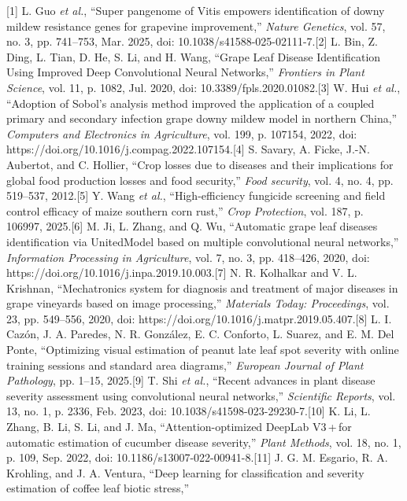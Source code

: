\documentclass[
]{article}
\begin{document}
{[}1{]} L. Guo \emph{et al.}, ``Super pangenome of Vitis empowers
identification of downy mildew resistance genes for grapevine
improvement,'' \emph{Nature Genetics}, vol. 57, no. 3, pp. 741--753,
Mar. 2025, doi: 10.1038/s41588-025-02111-7.{[}2{]} L. Bin, Z. Ding, L.
Tian, D. He, S. Li, and H. Wang, ``Grape Leaf Disease Identification
Using Improved Deep Convolutional Neural Networks,'' \emph{Frontiers in
Plant Science}, vol. 11, p. 1082, Jul. 2020, doi:
10.3389/fpls.2020.01082.{[}3{]} W. Hui \emph{et al.}, ``Adoption of
Sobol's analysis method improved the application of a coupled primary
and secondary infection grape downy mildew model in northern China,''
\emph{Computers and Electronics in Agriculture}, vol. 199, p. 107154,
2022, doi: https://doi.org/10.1016/j.compag.2022.107154.{[}4{]} S.
Savary, A. Ficke, J.-N. Aubertot, and C. Hollier, ``Crop losses due to
diseases and their implications for global food production losses and
food security,'' \emph{Food security}, vol. 4, no. 4, pp. 519--537,
2012.{[}5{]} Y. Wang \emph{et al.}, ``High-efficiency fungicide
screening and field control efficacy of maize southern corn rust,''
\emph{Crop Protection}, vol. 187, p. 106997, 2025.{[}6{]} M. Ji, L.
Zhang, and Q. Wu, ``Automatic grape leaf diseases identification via
UnitedModel based on multiple convolutional neural networks,''
\emph{Information Processing in Agriculture}, vol. 7, no. 3, pp.
418--426, 2020, doi: https://doi.org/10.1016/j.inpa.2019.10.003.{[}7{]}
N. R. Kolhalkar and V. L. Krishnan, ``Mechatronics system for diagnosis
and treatment of major diseases in grape vineyards based on image
processing,'' \emph{Materials Today: Proceedings}, vol. 23, pp.
549--556, 2020, doi: https://doi.org/10.1016/j.matpr.2019.05.407.{[}8{]}
L. I. Cazón, J. A. Paredes, N. R. González, E. C. Conforto, L. Suarez,
and E. M. Del Ponte, ``Optimizing visual estimation of peanut late leaf
spot severity with online training sessions and standard area
diagrams,'' \emph{European Journal of Plant Pathology}, pp. 1--15,
2025.{[}9{]} T. Shi \emph{et al.}, ``Recent advances in plant disease
severity assessment using convolutional neural networks,''
\emph{Scientific Reports}, vol. 13, no. 1, p. 2336, Feb. 2023, doi:
10.1038/s41598-023-29230-7.{[}10{]} K. Li, L. Zhang, B. Li, S. Li, and
J. Ma, ``Attention-optimized DeepLab V3\,+\,for automatic estimation of
cucumber disease severity,'' \emph{Plant Methods}, vol. 18, no. 1, p.
109, Sep. 2022, doi: 10.1186/s13007-022-00941-8.{[}11{]} J. G. M.
Esgario, R. A. Krohling, and J. A. Ventura, ``Deep learning for
classification and severity estimation of coffee leaf biotic stress,''
\end{document}
